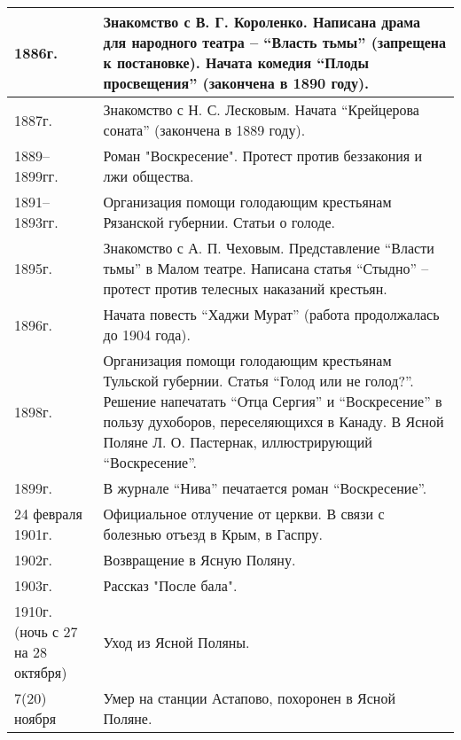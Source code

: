 \documentclass{article}
\begin{document}
\begin{longtable}[c]{|p{3cm}|p{8cm}|}
  \hline
  1886г. & Знакомство с В. Г. Короленко.
  Написана драма для народного театра – ``Власть тьмы'' (запрещена к постановке).
  Начата комедия ``Плоды просвещения'' (закончена в 1890 году).\\
  \hline
  1887г. & Знакомство с Н. С. Лесковым.
  Начата ``Крейцерова соната'' (закончена в 1889 году).\\
  \hline
  1889–1899гг. & Роман "Воскресение". Протест против беззакония и лжи общества.\\
  \hline
  1891–1893гг. & Организация помощи голодающим крестьянам Рязанской губернии. Статьи о голоде.\\
  \hline
  1895г. & Знакомство с А. П. Чеховым. Представление ``Власти тьмы'' в Малом театре.
  Написана статья ``Стыдно'' – протест против телесных наказаний крестьян.\\
  \hline
  1896г. & Начата повесть ``Хаджи Мурат'' (работа продолжалась до 1904 года).\\
  \hline
  1898г. & Организация помощи голодающим крестьянам Тульской губернии. Статья ``Голод или не голод?''.
  Решение напечатать ``Отца Сергия'' и ``Воскресение'' в пользу духоборов, переселяющихся в Канаду.
  В Ясной Поляне Л. О. Пастернак, иллюстрирующий ``Воскресение''.\\
  \hline
  1899г. & В журнале ``Нива'' печатается роман ``Воскресение''.\\
  \hline
  24 февраля 1901г. & Официальное отлучение от церкви. В связи с болезнью отъезд в Крым, в Гаспру.\\
  \hline
  1902г. & Возвращение в Ясную Поляну.\\
  \hline
  1903г. & Рассказ "После бала".\\
  \hline
  1910г. (ночь с 27 на 28 октября)  & Уход из Ясной Поляны.\\
  \hline
  7(20) ноября & Умер на станции Астапово, похоронен в Ясной Поляне.\\
  \bottomrule
\end{longtable}
\end{document}
